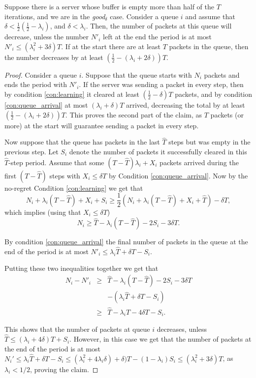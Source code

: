 \begin{lemma}\label{lm:open_server}
   Suppose there is a server whose buffer is empty more than half of the $T$ iterations, and we are in the \emph{good$_\delta$} case. Consider a queue $i$ and assume that $\delta < \frac12 (\frac12-\lambda_i)$, and $\delta < \lambda_i$. Then, the number of packets at this queue will decrease, unless the number $N'_i$ left at the end the period is at most $N'_i \le (\lambda^2_i+3\delta) T$. If at the start there are at least $T$ packets in the queue, then the number decreases by at least $\left(\frac12-(\lambda_i+2\delta)\right)T$.
\end{lemma}
\begin{proof}
Consider a queue $i$. Suppose that the queue starts with $N_i$ packets and ends the period with $N'_i$. If the server was sending a packet in every step, then by condition \ref{con:learning} it cleared at least $(\frac12-\delta)T$ packets, and by condition \ref{con:queue_arrival} at most $(\lambda_i+\delta)T$ arrived, decreasing the total by at least $(\frac12-(\lambda_i+2\delta))T$. This proves the second part of the claim, as $T$ packets (or more) at the start will guarantee sending a packet in every step.


Now suppose that the queue has packets in the last $\hat T$ steps but was empty in the previous step. Let $S_i$ denote the number of packets it successfully cleared in this $\hat T$-step period. Assume that some $(T-\hat T)\lambda_i +X_i$ packets arrived during the first $(T-\hat T)$ steps with $X_i\le \delta T$ by Condition \ref{con:queue_arrival}. Now by the no-regret Condition \ref{con:learning} we get that 
$$N_i+\lambda_i(T-\hat T)+X_i+S_i \ge \frac12 (N_i+\lambda_i(T-\hat T)+X_i+\hat T)-\delta T,$$ which implies (using that $X_i \le \delta T$)
$$
N_i \ge \hat T-\lambda_i(T-\hat T)-2S_i-3\delta T.
$$


By condition \ref{con:queue_arrival} the final number of packets in the queue at the end of the period is at most $N'_i\le\lambda_i \hat T+\delta T-S_i$. 

Putting these two inequalities together we get that 
\begin{eqnarray*}
    N_i-N'_i &\ge &\hat T-\lambda_i(T-\hat T)-2S_i-3 \delta T\\
 &  & -  (\lambda_i \hat T+\delta T-S_i)\\
    &\ge & \hat T-\lambda_i T -4\delta T -S_i.
\end{eqnarray*}


This shows that the number of packets at queue $i$ decreases, unless $\hat T \le (\lambda_i +4\delta) T+S_i$. However, in this case we get that the number of packets at the end of the period is at most $N_i'\le \lambda_i\hat T+\delta T-S_i\le (\lambda^2_i +4\lambda_i \delta)+\delta)T-(1-\lambda_i)S_i \le (\lambda^2_i +3\delta)T$, as $\lambda_i < 1/2$, proving the claim.
\end{proof}

